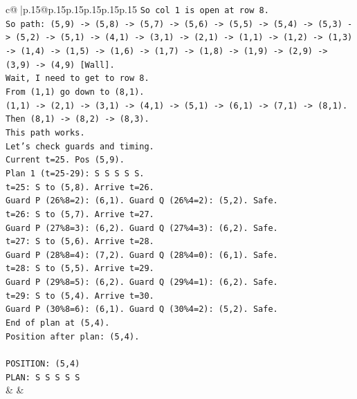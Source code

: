 \documentclass{article}
\begin{document}
{\begin{supertabular}{c@{$\;$}|p{.15\linewidth}@{}p{.15\linewidth}p{.15\linewidth}p{.15\linewidth}p{.15\linewidth}p{.15\linewidth}}
{{{\texttt{So col 1 is open at row 8.} \\
\texttt{So path: (5,9) {-}> (5,8) {-}> (5,7) {-}> (5,6) {-}> (5,5) {-}> (5,4) {-}> (5,3) {-}> (5,2) {-}> (5,1) {-}> (4,1) {-}> (3,1) {-}> (2,1) {-}> (1,1) {-}> (1,2) {-}> (1,3) {-}> (1,4) {-}> (1,5) {-}> (1,6) {-}> (1,7) {-}> (1,8) {-}> (1,9) {-}> (2,9) {-}> (3,9) {-}> (4,9) {[}Wall{]}.} \\
\texttt{Wait, I need to get to row 8.} \\
\texttt{From (1,1) go down to (8,1).} \\
\texttt{(1,1) {-}> (2,1) {-}> (3,1) {-}> (4,1) {-}> (5,1) {-}> (6,1) {-}> (7,1) {-}> (8,1).} \\
\texttt{Then (8,1) {-}> (8,2) {-}> (8,3).} \\
\texttt{This path works.} \\
\texttt{Let's check guards and timing.} \\
\texttt{Current t=25. Pos (5,9).} \\
\texttt{Plan 1 (t=25{-}29): S S S S S.} \\
\texttt{t=25: S to (5,8). Arrive t=26.} \\
\texttt{Guard P (26\%8=2): (6,1). Guard Q (26\%4=2): (5,2). Safe.} \\
\texttt{t=26: S to (5,7). Arrive t=27.} \\
\texttt{Guard P (27\%8=3): (6,2). Guard Q (27\%4=3): (6,2). Safe.} \\
\texttt{t=27: S to (5,6). Arrive t=28.} \\
\texttt{Guard P (28\%8=4): (7,2). Guard Q (28\%4=0): (6,1). Safe.} \\
\texttt{t=28: S to (5,5). Arrive t=29.} \\
\texttt{Guard P (29\%8=5): (6,2). Guard Q (29\%4=1): (6,2). Safe.} \\
\texttt{t=29: S to (5,4). Arrive t=30.} \\
\texttt{Guard P (30\%8=6): (6,1). Guard Q (30\%4=2): (5,2). Safe.} \\
\texttt{End of plan at (5,4).} \\
\texttt{Position after plan: (5,4).} \\
\\ 
\texttt{POSITION: (5,4)} \\
\texttt{PLAN: S S S S S} \\
            }
        }
    }
    & & \\ \\


\end{supertabular}}
\end{document}
